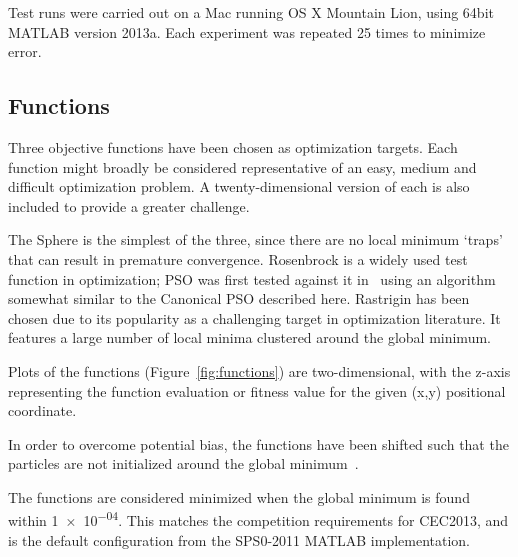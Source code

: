 \documentclass{csfourzero}
\begin{document}
Test runs were carried out on a Mac running OS X Mountain Lion, using
64bit MATLAB version 2013a. Each experiment was repeated 25 times to minimize
error.

\subsection{Functions}

Three objective functions have been chosen as optimization targets. Each
function might broadly be considered representative of an easy, medium and
difficult optimization problem. A twenty-dimensional version of each is also
included to provide a greater challenge.

The Sphere is the simplest of the three, since there are no local minimum
`traps' that can result in premature convergence. Rosenbrock is a widely used
test function in optimization; PSO was first tested against it
in~\cite{Shi:1999je} using an algorithm somewhat similar to the Canonical PSO
described here.  Rastrigin has been chosen due to its popularity as a
challenging target in optimization literature. It features a large number of
local minima clustered around the global minimum.

Plots of the functions (Figure~\ref{fig:functions}) are two-dimensional, with
the z-axis representing the function evaluation or fitness value for the given
(x,y) positional coordinate.

In order to overcome potential bias, the functions have been shifted such that
the particles are not initialized around the global
minimum~\cite{Monson:2005fn}.

The functions are considered minimized when the global minimum is found within
\num{1e-04}. This matches the competition requirements for CEC2013, and is the
default configuration from the SPS0-2011 MATLAB implementation.
\end{document}
